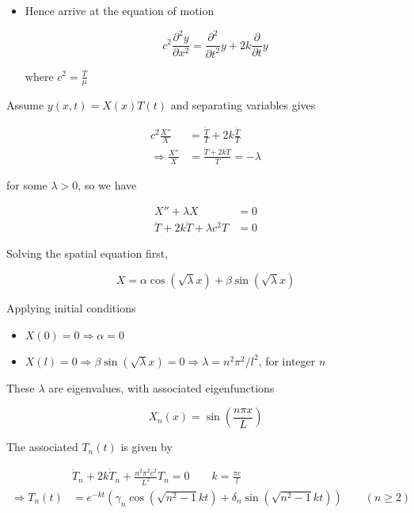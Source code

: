 \documentclass[a4paper]{article}
\begin{document}
\begin{enumerate}
\begin{itemize}
		\item Hence arrive at the equation of motion 
		
		\[ c^{2} \frac{\partial^{2} y }{\partial x^{2}}   = \frac{\partial^{2} }{\partial t^{2}} y +  2k \frac{\partial  }{\partial t}y \]
		
		where $ c^{2} = \frac{T}{\mu} $
		
	\end{itemize}
		
		Assume $ y(x,t) = X(x)T(t) $ and separating variables gives
		
		\begin{align*}
		c^{2} \frac{X''}{X} & = \frac{\ddot{T}}{T} + 2k \frac{\dot{T}}{T}    \\
		\Rightarrow  \frac{X''}{X} & = \frac{\ddot{T} + 2k \dot{T} }{T} = - \lambda 
		\end{align*}
		
		for some $ \lambda > 0 $, so we have
		
		\begin{align*}
		X'' + \lambda X& =0 \\
		\ddot{T}  + 2k \dot{T} + \lambda c^{2} T & = 0 
		\end{align*}
		
		Solving the spatial equation first,
		
		\[ X = \alpha \cos ( \sqrt{\lambda} x ) + \beta \sin ( \sqrt{\lambda} x ) \]
		
		Applying initial conditions
		
		\begin{itemize}
			\item $ X(0) = 0 \Rightarrow \alpha = 0$
			\item $ X(l) = 0 \Rightarrow \beta \sin ( \sqrt{\lambda} x ) = 0 \Rightarrow \lambda = n^{2} \pi^{2} / l^{2} $, for integer $ n $
		\end{itemize}
	
		These $ \lambda $ are eigenvalues, with associated eigenfunctions
		
		\[ X_{n}(x) = \sin \left(  \frac{n \pi x}{L} \right)  \]
		
		The associated $ T_{n}(t) $ is given by
		
		\begin{align*}
		\qquad  & \ddot{T}_{n} + 2k \dot{T}_{n}  + \frac{n^{2} \pi^{2} c^{2} }{L^{2}}  T_{n} = 0 \qquad k = \frac{\pi c}{l}\\
		\Rightarrow T_{n}(t) & = e^{-kt} \left(    \gamma_{n} \cos \left(  \sqrt{n^{2} - 1} k t \right) + \delta_{n} \sin \left(  \sqrt{n^{2} - 1} k t \right)  \right) \qquad (n \geq 2)
		\end{align*}
		

\end{enumerate}
\end{document}

